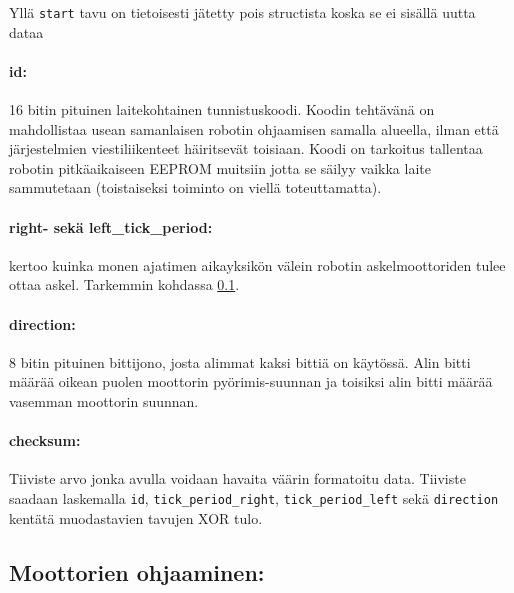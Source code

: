 \documentclass[]{article} %
\numberwithin{equation}{section}
\numberwithin{figure}{section}
\numberwithin{table}{section}
\begin{document}
Yllä \verb+start+ tavu on tietoisesti jätetty pois structista koska se ei sisällä uutta dataa

\paragraph{id:} 16 bitin pituinen laitekohtainen tunnistuskoodi. Koodin tehtävänä on mahdollistaa usean samanlaisen robotin ohjaamisen samalla alueella, ilman että järjestelmien viestiliikenteet häiritsevät toisiaan. Koodi on tarkoitus tallentaa robotin pitkäaikaiseen EEPROM muitsiin jotta se säilyy vaikka laite sammutetaan (toistaiseksi toiminto on viellä toteuttamatta).

\paragraph{right- sekä left\_tick\_period:} kertoo kuinka monen ajatimen aikayksikön välein robotin askelmoottoriden tulee ottaa askel. Tarkemmin kohdassa \ref{sec:Moottorien ohjaaminen}.
 
\paragraph{direction:} 8 bitin pituinen bittijono, josta alimmat kaksi bittiä on käytössä. Alin bitti määrää oikean puolen moottorin pyörimis-suunnan ja toisiksi alin bitti määrää vasemman moottorin suunnan.

\paragraph{checksum:} Tiiviste arvo jonka avulla voidaan havaita väärin formatoitu data. Tiiviste saadaan laskemalla \verb+id+, \verb+tick_period_right+, \verb+tick_period_left+ sekä \verb+direction+ kentätä muodastavien tavujen XOR tulo. 


\subsection{Moottorien ohjaaminen:}
\label{sec:Moottorien ohjaaminen}
\end{document}
